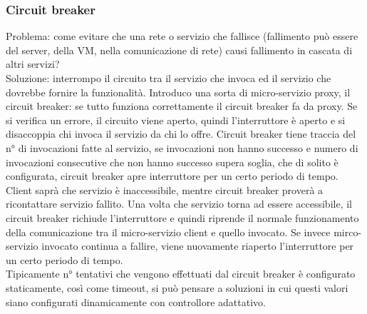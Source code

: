 \documentclass[16px]{article}
\begin{document}
\subsubsection{Circuit breaker}
Problema: come evitare che una rete o servizio che fallisce (fallimento può essere del server, della VM, nella comunicazione di rete) causi fallimento in cascata di altri servizi?\\ Soluzione: interrompo il circuito tra il servizio che invoca ed il servizio che dovrebbe fornire la funzionalità. Introduco una sorta di micro-servizio proxy, il circuit breaker: se tutto funziona correttamente il circuit breaker fa da proxy. Se si verifica un errore, il circuito viene aperto, quindi l'interruttore è aperto e si disaccoppia chi invoca il servizio da chi lo offre. Circuit breaker tiene traccia del n° di invocazioni fatte al servizio, se invocazioni non hanno successo e numero di invocazioni consecutive che non hanno successo supera soglia, che di solito è configurata, circuit breaker apre interruttore per un certo periodo di tempo. Client saprà che servizio è inaccessibile, mentre circuit breaker proverà a ricontattare servizio fallito. Una volta che servizio torna ad essere accessibile, il circuit breaker richiude l'interruttore e quindi riprende il normale funzionamento della comunicazione tra il micro-servizio client e quello invocato. Se invece mirco-servizio invocato continua a fallire, viene nuovamente riaperto l'interruttore per un certo periodo di tempo.\\ Tipicamente n° tentativi che vengono effettuati dal circuit breaker è configurato staticamente, così come timeout, si può pensare a soluzioni in cui questi valori siano configurati dinamicamente con controllore adattativo.
\end{document}
